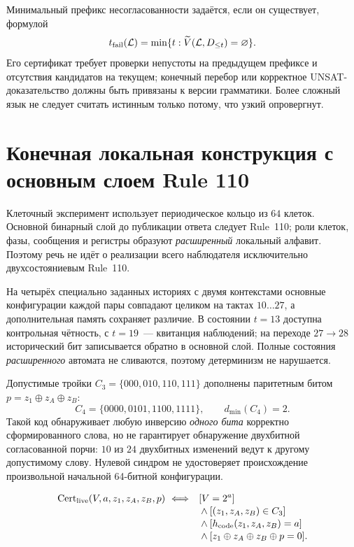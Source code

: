 \documentclass[11pt,a4paper]{article}
\newcommand{\VS}{\widetilde V}
\begin{document}
Минимальный префикс несогласованности задаётся, если он существует, формулой
\begin{equation}\label{eq:failprefix}
t_{\rm fail}(\mathcal L)=\min\{t:\VS(\mathcal L,D_{\le t})=\varnothing\}.
\end{equation}
Его сертификат требует проверки непустоты на предыдущем префиксе и отсутствия кандидатов на текущем; конечный перебор или корректное UNSAT-доказательство должны быть привязаны к версии грамматики. Более сложный язык не следует считать истинным только потому, что узкий опровергнут.

\section{Конечная локальная конструкция с основным слоем Rule 110}

Клеточный эксперимент использует периодическое кольцо из $64$ клеток. Основной бинарный слой до публикации ответа следует Rule~110; роли клеток, фазы, сообщения и регистры образуют \emph{расширенный} локальный алфавит. Поэтому речь не идёт о реализации всего наблюдателя исключительно двухсостояниевым Rule~110.

На четырёх специально заданных историях с двумя контекстами основные конфигурации каждой пары совпадают целиком на тактах $10\ldots27$, а дополнительная память сохраняет различие. В состоянии $t=13$ доступна контрольная чётность, с $t=19$~--- квитанция наблюдений; на переходе $27\to28$ исторический бит записывается обратно в основной слой. Полные состояния \emph{расширенного} автомата не сливаются, поэтому детерминизм не нарушается.

Допустимые тройки $C_3=\{000,010,110,111\}$ дополнены паритетным битом $p=z_1\oplus z_A\oplus z_B$:
\begin{equation}\label{eq:code}
C_4=\{0000,0101,1100,1111\},\qquad d_{\min}(C_4)=2.
\end{equation}
Такой код обнаруживает любую инверсию \emph{одного бита} корректно сформированного слова, но не гарантирует обнаружение двухбитной согласованной порчи: $10$ из $24$ двухбитных изменений ведут к другому допустимому слову. Нулевой синдром не удостоверяет происхождение произвольной начальной 64-битной конфигурации.

\begin{equation}\label{eq:live}
\begin{aligned}
\mathrm{Cert}_{\rm live}(V,a,z_1,z_A,z_B,p)\ \Longleftrightarrow\quad
 &[V=2^a]\\[-2pt]
 &\land[(z_1,z_A,z_B)\in C_3]\\[-2pt]
 &\land[h_{\rm code}(z_1,z_A,z_B)=a]\\[-2pt]
 &\land[z_1\oplus z_A\oplus z_B\oplus p=0].
\end{aligned}
\end{equation}
\end{document}
